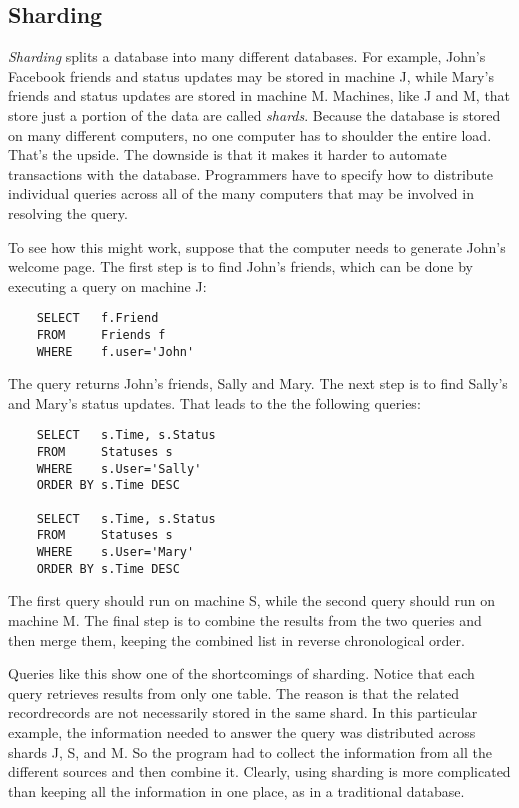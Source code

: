 \subsection{Sharding}

\emph{Sharding} splits a database into many different databases.
For example, John's Facebook friends and status updates may be stored in machine J, while
Mary's friends and status updates are stored in machine M.
Machines, like J and M, that store just a portion of the data are called \emph{shards}.
Because the database is stored on many different computers,
no one computer has to shoulder the entire load.
That's the upside.
The downside is that it makes it harder
to automate transactions with the database.
Programmers have to specify how to distribute
individual queries across all of the many computers
that may be involved in resolving the query.

To see how this might work,
suppose that the computer needs to generate John's welcome page.
The first step is to find John's friends,
which can be done by executing a query on machine J:
\begin{verbatim}
	SELECT   f.Friend
	FROM     Friends f
	WHERE    f.user='John'
\end{verbatim}
The query returns John's friends, Sally and Mary.
The next step is to find Sally's and Mary's status updates.
That leads to the the following queries:
\begin{verbatim}
	SELECT   s.Time, s.Status
	FROM     Statuses s
	WHERE    s.User='Sally'
	ORDER BY s.Time DESC

	SELECT   s.Time, s.Status
	FROM     Statuses s
	WHERE    s.User='Mary'
	ORDER BY s.Time DESC
\end{verbatim}
The first query should run on machine S,
while the second query should run on machine M.
The final step is to combine the results from the two queries
and then merge them, keeping
the combined list in reverse chronological order.

Queries like this show one of the shortcomings of sharding.
Notice that each query retrieves results from only one table.
The reason is that the related recordrecords are not necessarily stored in the same shard.
In this particular example, the information needed to answer the query was
distributed across shards J, S, and M.
So the program had to collect the information
from all the different sources and then combine it.
Clearly, using sharding is more complicated
than keeping all the information in one place,
as in a traditional database.

